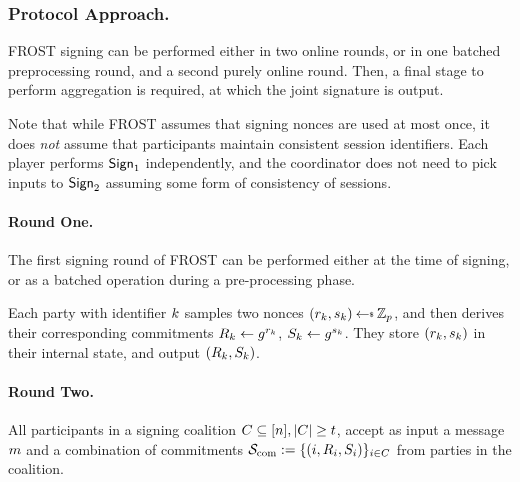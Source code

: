 \subsubsection{Protocol Approach.}

FROST signing can be performed either in two online rounds,
or in one batched preprocessing round,
and a second purely online round.
Then, a final stage to perform aggregation is required,
at which the joint signature is output.

Note that while FROST assumes that signing nonces are used at most once, 
it does \emph{not} assume that participants maintain consistent session identifiers.
Each player performs $\mathsf{Sign}_1$ independently,
and the coordinator does not need to pick inputs to $\mathsf{Sign}_2$ assuming some form of consistency of sessions.

\paragraph{Round One.}
The first signing round of FROST can be performed either at the time of signing,
or as a batched operation during a pre-processing phase.

Each party with identifier $k$  samples two nonces $(r_{\partyid},  s_{\partyid}) \randpick \Zp$,
and then derives their corresponding commitments  $R_{k} \gets g^{r_{k}}$, $ S_{k} \gets  g^{s_{k}}$.
They store $(r_{k}, s_{k})$ in their internal state,
and output $(R_{k}, S_{k})$.

\paragraph{Round Two.}
All participants in a signing coalition $C \subseteq [n], \lvert C \rvert \geq t$,  accept as input a message $m$ and a combination of commitments $\mathcal{S}_{\rm com} := \{ (i, R_{i}, S_{i})\}_{i \in C}$ from parties in the coalition.

